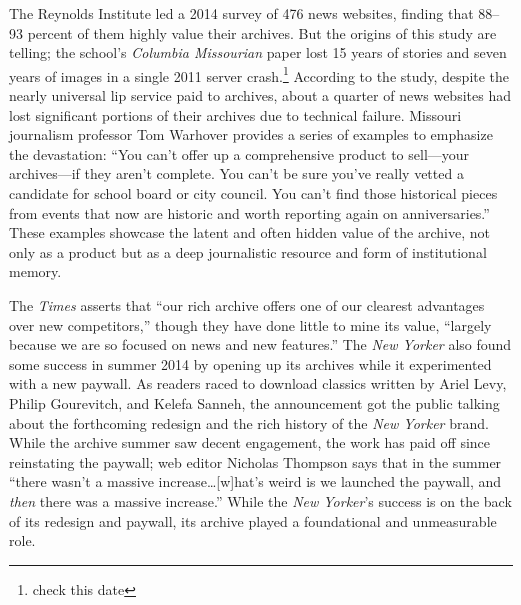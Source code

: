 The Reynolds Institute led a 2014 survey of 476 news websites, finding that 88--93 percent of them highly value their archives. But the origins of this study are telling; the school's \emph{Columbia Missourian} paper lost 15 years of stories and seven years of images in a single 2011 server crash.\footnote{check this date} According to the study, despite the nearly universal lip service paid to archives, about a quarter of news websites had lost significant portions of their archives due to technical failure. Missouri journalism professor Tom Warhover provides a series of examples to emphasize the devastation: ``You can't offer up a comprehensive product to sell---your archives---if they aren't complete. You can't be sure you've really vetted a candidate for school board or city council. You can't find those historical pieces from events that now are historic and worth reporting again on anniversaries.''\autocite{mccain_saving_2014} These examples showcase the latent and often hidden value of the archive, not only as a product but as a deep journalistic resource and form of institutional memory.

The \emph{Times} asserts that ``our rich archive offers one of our clearest advantages over new competitors,'' though they have done little to mine its value, ``largely because we are so focused on news and new features.''\autocite[28]{_innovation_2014}  The \emph{New Yorker} also found some success in summer 2014 by opening up its archives while it experimented with a new paywall. As readers raced to download classics written by Ariel Levy, Philip Gourevitch, and Kelefa Sanneh, the announcement got the public talking about the forthcoming redesign and the rich history of the \emph{New Yorker} brand. While the archive summer saw decent engagement, the work has paid off since reinstating the paywall; web editor Nicholas Thompson says that in the summer ``there wasn't a massive increase\ldots[w]hat's weird is we launched the paywall, and \emph{then} there was a massive increase.''\autocite{ellis_after_2015} While the \emph{New Yorker}'s success is on the back of its redesign and paywall, its archive played a foundational and unmeasurable role.

